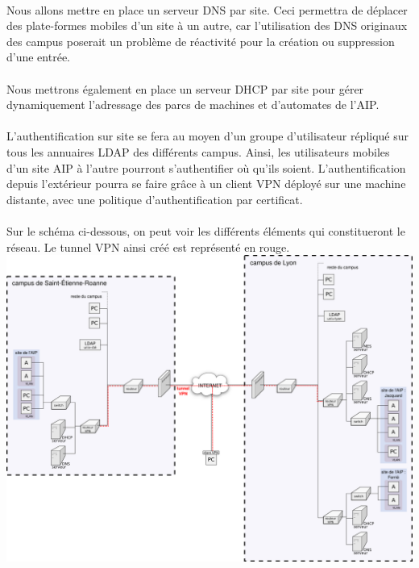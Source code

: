 \documentclass[a4paper]{article}
\begin{document}
	\paragraph*{} %
	Nous allons mettre en place un serveur DNS par site. Ceci permettra de déplacer des plate-formes mobiles d'un site à un autre, car l'utilisation des DNS originaux des campus poserait un problème de réactivité pour la création ou suppression d'une entrée. 
	
	\paragraph*{} %
	Nous mettrons également en place un serveur DHCP par site pour gérer dynamiquement l'adressage des parcs de machines et d'automates de l'AIP. 
	
	\paragraph*{} %
	L'authentification sur site se fera au moyen d'un groupe d'utilisateur répliqué sur tous les annuaires LDAP des différents campus. Ainsi, les utilisateurs mobiles d'un site AIP à l'autre pourront s'authentifier où qu'ils soient. L'authentification depuis l'extérieur pourra se faire grâce à un client VPN déployé sur une machine distante, avec une politique d'authentification par certificat. 
	
	\paragraph*{} %
	Sur le schéma ci-dessous, on peut voir les différents éléments qui constitueront le réseau. Le tunnel VPN ainsi créé est représenté en rouge. \\
	\includegraphics[width=\linewidth]{schema_archi.png}
\end{document}
